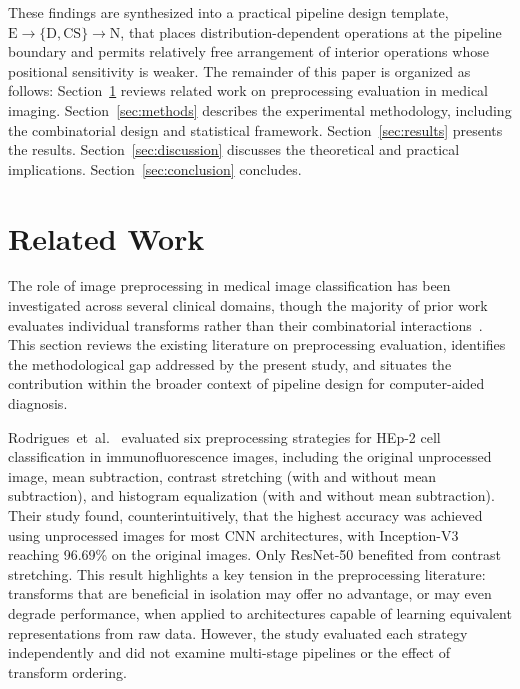 \documentclass[preprint,5p,times,twocolumn]{elsarticle}
\begin{document}
These findings are synthesized into a practical pipeline design template, $\text{E} \to \{\text{D},\text{CS}\} \to \text{N}$, that places distribution-dependent operations at the pipeline boundary and permits relatively free arrangement of interior operations whose positional sensitivity is weaker. The remainder of this paper is organized as follows: Section~\ref{sec:related} reviews related work on preprocessing evaluation in medical imaging. Section~\ref{sec:methods} describes the experimental methodology, including the combinatorial design and statistical framework. Section~\ref{sec:results} presents the results. Section~\ref{sec:discussion} discusses the theoretical and practical implications. Section~\ref{sec:conclusion} concludes.

\section{Related Work}
\label{sec:related}

The role of image preprocessing in medical image classification has been investigated across several clinical domains, though the majority of prior work evaluates individual transforms rather than their combinatorial interactions~\cite{Koresh2024}. This section reviews the existing literature on preprocessing evaluation, identifies the methodological gap addressed by the present study, and situates the contribution within the broader context of pipeline design for computer-aided diagnosis.

Rodrigues~et~al.~\cite{RODRIGUES2020103542} evaluated six preprocessing strategies for HEp-2 cell classification in immunofluorescence images, including the original unprocessed image, mean subtraction, contrast stretching (with and without mean subtraction), and histogram equalization (with and without mean subtraction). Their study found, counterintuitively, that the highest accuracy was achieved using unprocessed images for most CNN architectures, with Inception-V3 reaching 96.69\% on the original images. Only ResNet-50 benefited from contrast stretching. This result highlights a key tension in the preprocessing literature: transforms that are beneficial in isolation may offer no advantage, or may even degrade performance, when applied to architectures capable of learning equivalent representations from raw data. However, the study evaluated each strategy independently and did not examine multi-stage pipelines or the effect of transform ordering.
\end{document}
